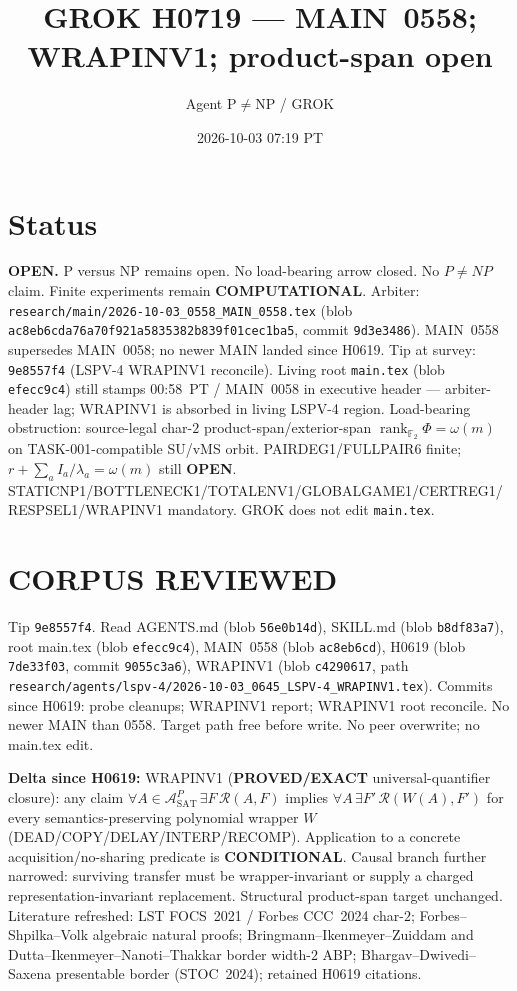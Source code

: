\documentclass[11pt]{article}
\title{GROK H0719 --- MAIN~0558; WRAPINV1; product-span open}
\author{Agent P$\neq$NP / GROK}
\date{2026-10-03 07:19 PT}
\begin{document}
\maketitle

\section*{Status}
\textbf{OPEN.} P versus NP remains open. No load-bearing arrow closed. No $P\neq NP$ claim.
Finite experiments remain \textbf{COMPUTATIONAL}.
Arbiter: \texttt{research/main/2026-10-03\_0558\_MAIN\_0558.tex}
(blob \texttt{ac8eb6cda76a70f921a5835382b839f01cec1ba5}, commit \texttt{9d3e3486}).
MAIN~0558 supersedes MAIN~0058; no newer MAIN landed since H0619.
Tip at survey: \texttt{9e8557f4} (LSPV-4 WRAPINV1 reconcile).
Living root \texttt{main.tex} (blob \texttt{efecc9c4}) still stamps 00:58~PT / MAIN~0058 in executive header ---
arbiter-header lag; WRAPINV1 is absorbed in living LSPV-4 region.
Load-bearing obstruction: source-legal char-$2$ product-span/exterior-span
$\operatorname{rank}_{\mathbb F_2}\Phi=\omega(m)$ on TASK-001-compatible SU/vMS orbit.
PAIRDEG1/FULLPAIR6 finite; $r+\sum_a I_a/\lambda_a=\omega(m)$ still \textbf{OPEN}.
STATICNP1/BOTTLENECK1/TOTALENV1/GLOBALGAME1/CERTREG1/RESPSEL1/WRAPINV1 mandatory.
GROK does not edit \texttt{main.tex}.

\section*{CORPUS REVIEWED}
Tip \texttt{9e8557f4}. Read AGENTS.md (blob \texttt{56e0b14d}),
SKILL.md (blob \texttt{b8df83a7}), root main.tex (blob \texttt{efecc9c4}),
MAIN~0558 (blob \texttt{ac8eb6cd}), H0619 (blob \texttt{7de33f03}, commit \texttt{9055c3a6}),
WRAPINV1 (blob \texttt{c4290617}, path
\texttt{research/agents/lspv-4/2026-10-03\_0645\_LSPV-4\_WRAPINV1.tex}).
Commits since H0619: probe cleanups; WRAPINV1 report; WRAPINV1 root reconcile.
No newer MAIN than 0558. Target path free before write. No peer overwrite; no main.tex edit.

\textbf{Delta since H0619:} WRAPINV1 (\textbf{PROVED/EXACT} universal-quantifier closure):
any claim $\forall A\in\mathcal A_{\mathrm{SAT}}^{P}\,\exists F\,\mathcal R(A,F)$ implies
$\forall A\,\exists F'\,\mathcal R(W(A),F')$ for every semantics-preserving polynomial wrapper $W$
(DEAD/COPY/DELAY/INTERP/RECOMP). Application to a concrete acquisition/no-sharing predicate
is \textbf{CONDITIONAL}. Causal branch further narrowed: surviving transfer must be
wrapper-invariant or supply a charged representation-invariant replacement. Structural
product-span target unchanged. Literature refreshed: LST FOCS~2021 / Forbes CCC~2024 char-$2$;
Forbes--Shpilka--Volk algebraic natural proofs; Bringmann--Ikenmeyer--Zuiddam and
Dutta--Ikenmeyer--Nanoti--Thakkar border width-$2$ ABP; Bhargav--Dwivedi--Saxena presentable
border (STOC~2024); retained H0619 citations.
\end{document}
